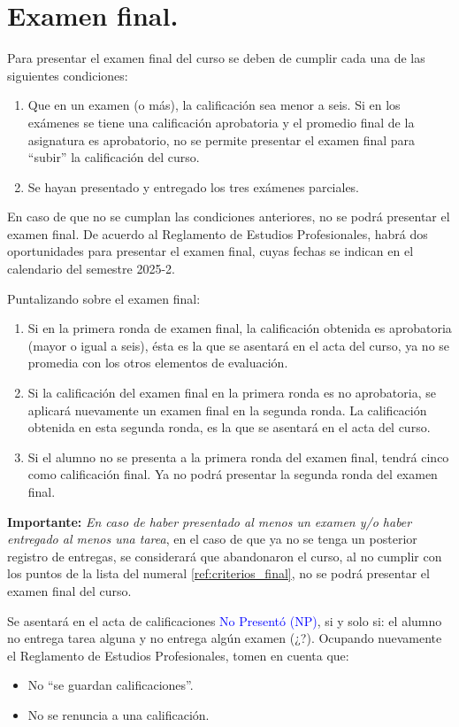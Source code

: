 \documentclass[hidelinks,12pt]{article}
\begin{document}
\section{Examen final.}

Para presentar el examen final del curso se deben de cumplir cada una de las siguientes condiciones:
\begin{enumerate}\label{ref:criterios_final}
\item Que en un examen (o más), la calificación sea menor a seis. Si en los exámenes se tiene una calificación aprobatoria y el promedio final de la asignatura es aprobatorio, no se permite presentar el examen final para \enquote{subir} la calificación del curso.
\item Se hayan presentado y entregado los tres exámenes parciales.
\end{enumerate}
En caso de que no se cumplan las condiciones anteriores, no se podrá presentar el examen final. De acuerdo al Reglamento de Estudios Profesionales, habrá dos oportunidades para presentar el examen final, cuyas fechas se indican en el calendario del semestre 2025-2.
\par
Puntalizando sobre el examen final:
\begin{enumerate}[label=\roman*)]
\item Si en la primera ronda de examen final, la calificación obtenida es aprobatoria (mayor o igual a seis), ésta es la que se asentará en el acta del curso, ya no se promedia con los otros elementos de evaluación.
\item Si la calificación del examen final en la primera ronda es no aprobatoria, se aplicará nuevamente un examen final en la segunda ronda. La calificación obtenida en esta segunda ronda, es la que se asentará en el acta del curso.
\item Si el alumno no se presenta a la primera ronda del examen final, tendrá cinco como calificación final. Ya no podrá presentar la segunda ronda del examen final.
\end{enumerate}
\par
\textbf{Importante: } \emph{En caso de haber presentado al menos un examen y/o haber entregado al menos una tarea}, en el caso de que ya no se tenga un posterior registro de entregas, se considerará que abandonaron el curso, al no cumplir con los puntos de la lista del numeral \ref{ref:criterios_final}, no se podrá presentar el examen final del curso.
\par
Se asentará en el acta de calificaciones \textcolor{blue}{No Presentó (NP)}, si y solo si: el alumno no entrega tarea alguna y no entrega algún examen (¿?). Ocupando nuevamente el Reglamento de Estudios Profesionales, tomen en cuenta que:
\begin{itemize}
\setlength\itemsep{1pt}
\item No \enquote{se guardan calificaciones}.
\item No se renuncia a una calificación.
\end{itemize}
\end{document}
